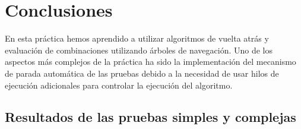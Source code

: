\documentclass[12pt, a4paper]{article}
\begin{document}
\section{Conclusiones}

En esta práctica hemos aprendido a utilizar algoritmos de vuelta
atrás y evaluación de combinaciones utilizando árboles de navegación.
Uno de los aspectos más complejos de la práctica ha sido la
implementación del mecanismo de parada automática de las pruebas
debido a la necesidad de usar hilos de ejecución adicionales para
controlar la ejecución del algoritmo.

\begin{landscape}
    \section{Resultados de las pruebas simples y complejas}

    
\end{landscape}
\end{document}
